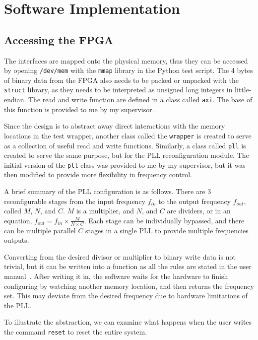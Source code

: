 \chapter{Software Implementation}

\section{Accessing the FPGA}
The interfaces are mapped onto the physical memory, thus they can be accessed by opening \texttt{/dev/mem} with the \texttt{mmap} library in the Python test script.
The 4 bytes of binary data from the FPGA also needs to be packed or unpacked with the \texttt{struct} library, as they needs to be interpreted as unsigned long integers in little-endian.
The read and write function are defined in a class called \texttt{axi}.
The base of this function is provided to me by my supervisor.

Since the design is to abstract away direct interactions with the memory locations in the test wrapper, another class called the \texttt{wrapper} is created to serve as a collection of useful read and write functions.
Similarly, a class called \texttt{pll} is created to serve the same purpose, but for the PLL reconfiguration module.
The initial version of the \texttt{pll} class was provided to me by my supervisor, but it was then modified to provide more flexibility in frequency control.

A brief summary of the PLL configuration is as follows.
There are 3 reconfigurable stages from the input frequency $f_{in}$ to the output frequency $f_{out}$, called $M$, $N$, and $C$.
$M$ is a multiplier, and $N$, and $C$ are dividers, or in an equation,
$f_{out} = f_{in} \times \frac{M}{N \times C}$.
Each stage can be individually bypassed, and there can be multiple parallel $C$ stages in a single PLL to provide multiple frequencies outputs.

Converting from the desired divisor or multiplier to binary write data is not trivial, but it can be written into a function as all the rules are stated in the user manual~\cite{Altera7}.
After writing it in, the software waits for the hardware to finish configuring by watching another memory location, and then returns the frequency set.
This may deviate from the desired frequency due to hardware limitations of the PLL.

To illustrate the abstraction, we can examine what happens when the user writes the command \texttt{reset} to reset the entire system.

